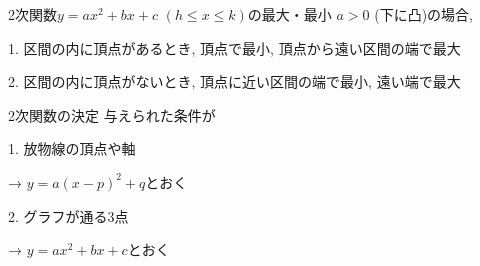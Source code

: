 \documentclass[aspectratio=169, 12pt]{beamer}
\begin{document}
\begin{frame}{2次関数$y=ax^2+bx+c$ $(h\leq x \leq k)$の最大・最小}
    $a>0$ (下に凸)の場合, \par
    1. 区間の内に頂点があるとき,  頂点で最小, 頂点から遠い区間の端で最大 \par
    2. 区間の内に頂点がないとき,  頂点に近い区間の端で最小, 遠い端で最大
\end{frame}
\begin{frame}{2次関数の決定}
    与えられた条件が\par
    1. 放物線の頂点や軸 \par
    \begin{center}
        → $y=a(x-p)^2+q$とおく \par
    \end{center}
    2. グラフが通る3点 \par
    \begin{center}
        → $y=ax^2+bx+c$とおく
    \end{center}
\end{frame}
\end{document}
